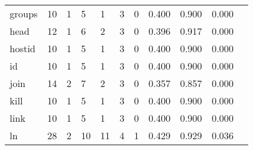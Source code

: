 \begin{longtable}{lp{1.10cm}p{1.10cm}p{1.10cm}p{1.10cm}p{1.10cm}p{1.10cm}p{1.10cm}p{1.10cm}p{1.10cm}p{1.10cm}}
groups    &                     10 &                                  1 &                                 5 &                                1 &                                 3 &                               0 &                          0.400 &                                 0.900 &                               0.000 \\
head      &                     12 &                                  1 &                                 6 &                                2 &                                 3 &                               0 &                          0.396 &                                 0.917 &                               0.000 \\
hostid    &                     10 &                                  1 &                                 5 &                                1 &                                 3 &                               0 &                          0.400 &                                 0.900 &                               0.000 \\
id        &                     10 &                                  1 &                                 5 &                                1 &                                 3 &                               0 &                          0.400 &                                 0.900 &                               0.000 \\
join      &                     14 &                                  2 &                                 7 &                                2 &                                 3 &                               0 &                          0.357 &                                 0.857 &                               0.000 \\
kill      &                     10 &                                  1 &                                 5 &                                1 &                                 3 &                               0 &                          0.400 &                                 0.900 &                               0.000 \\
link      &                     10 &                                  1 &                                 5 &                                1 &                                 3 &                               0 &                          0.400 &                                 0.900 &                               0.000 \\
ln        &                     28 &                                  2 &                                10 &                               11 &                                 4 &                               1 &                          0.429 &                                 0.929 &                               0.036 \\

\end{longtable}
